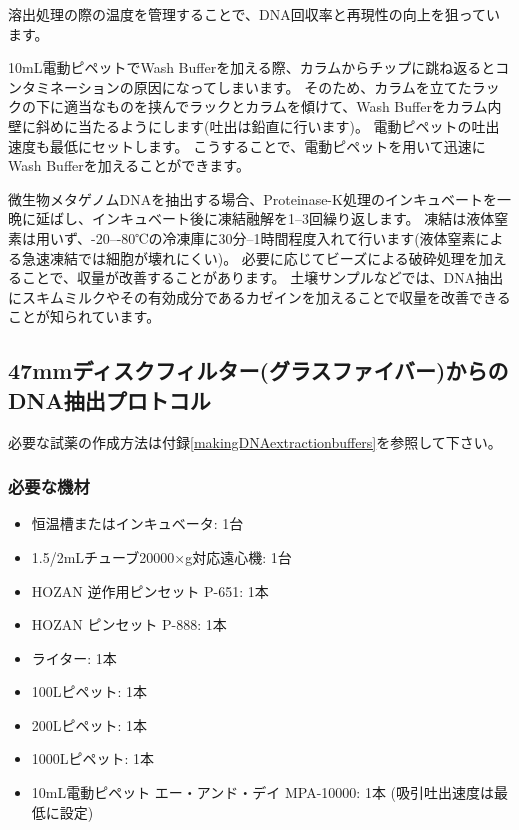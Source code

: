 \documentclass[titlepage,10pt,a4paper,uplatex]{jsbook}
\begin{document}
溶出処理の際の温度を管理することで、DNA回収率と再現性の向上を狙っています。

10mL電動ピペットでWash Bufferを加える際、カラムからチップに跳ね返るとコンタミネーションの原因になってしまいます。
そのため、カラムを立てたラックの下に適当なものを挟んでラックとカラムを傾けて、Wash Bufferをカラム内壁に斜めに当たるようにします(吐出は鉛直に行います)。
電動ピペットの吐出速度も最低にセットします。
こうすることで、電動ピペットを用いて迅速にWash Bufferを加えることができます。

微生物メタゲノムDNAを抽出する場合、Proteinase-K処理のインキュベートを一晩に延ばし、インキュベート後に凍結融解を1--3回繰り返します。
凍結は液体窒素は用いず、{-20}--{-80}℃の冷凍庫に30分--1時間程度入れて行います(液体窒素による急速凍結では細胞が壊れにくい)。
必要に応じてビーズによる破砕処理を加えることで、収量が改善することがあります。
土壌サンプルなどでは、DNA抽出にスキムミルクやその有効成分であるカゼインを加えることで収量を改善できることが知られています\citep{Takada-Hoshino2004,Wang2012}。

\subsection{47mmディスクフィルター(グラスファイバー)からのDNA抽出プロトコル}

必要な試薬の作成方法は付録\ref{makingDNAextractionbuffers}を参照して下さい。

\subsubsection{必要な機材}
\begin{itemize}
\item 恒温槽またはインキュベータ: 1台
\item 1.5/2mLチューブ20000×g対応遠心機: 1台
\item HOZAN 逆作用ピンセット P-651: 1本
\item HOZAN ピンセット P-888: 1本
\item ライター: 1本
\item 100{\textmu}Lピペット: 1本
\item 200{\textmu}Lピペット: 1本
\item 1000{\textmu}Lピペット: 1本
\item 10mL電動ピペット エー・アンド・デイ MPA-10000: 1本 (吸引吐出速度は最低に設定)
\end{itemize}
\end{document}
